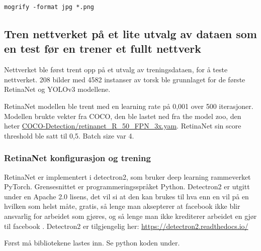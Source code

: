\begin{verbatim}
mogrify -format jpg *.png
\end{verbatim}

\subsection{Tren nettverket på et lite utvalg av dataen som en test før en trener et fullt nettverk}

Nettverket ble først trent opp på et utvalg av treningsdataen, for å teste nettverket. 208 bilder med 4582 instanser av torsk ble grunnlaget for de første RetinaNet og YOLOv3 modellene.

RetinaNet modellen ble trent med en learning rate på 0,001 over 500 iterasjoner. Modellen brukte vekter fra COCO, den ble lastet ned fra the model zoo, den heter \url{COCO-Detection/retinanet_R_50_FPN_3x.yam}. RetinaNet sin score threshold ble satt til 0,5. Batch size var 4.

\subsubsection{RetinaNet konfigurasjon og trening}

RetinaNet er implementert i detectron2, som bruker deep learning rammeverket PyTorch. Grensesnittet er programmeringsspråket Python. Detectron2 er utgitt under en Apache 2.0 lisens, det vil si at den kan brukes til hva enn en vil på en hvilken som helst måte, gratis, så lenge man aksepterer at facebook ikke blir ansvarlig for arbeidet som gjøres, og så lenge man ikke krediterer arbeidet en gjør til facebook \cite{The Apache Software Foundation 2004}. Detectron2 er tilgjengelig her: \url{https://detectron2.readthedocs.io/}

Først må bibliotekene lastes inn. Se python koden under.

